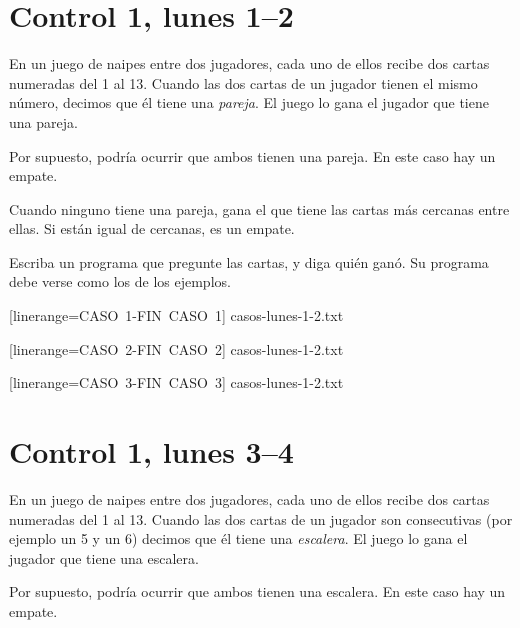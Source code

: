 \documentclass[12pt,spanish,a5paper,landscape]{article}
\begin{document}
  \pagestyle{empty}
  \thispagestyle{empty}

  \part*{Control 1, lunes 1--2}
  \newpage

  En un juego de naipes entre dos jugadores,
  cada uno de ellos recibe dos cartas numeradas del 1 al 13.
  Cuando las dos cartas de un jugador tienen el mismo número,
  decimos que él tiene una \emph{pareja}.
  El juego lo gana el jugador que tiene una pareja.

  Por supuesto,
  podría ocurrir que ambos tienen una pareja.
  En este caso hay un empate.

  Cuando ninguno tiene una pareja,
  gana el que tiene las cartas más cercanas entre ellas.
  Si están igual de cercanas, es un empate.

  Escriba un programa que pregunte las cartas,
  y diga quién ganó.
  Su programa debe verse como los de los ejemplos.

  \begin{minipage}{0.25\textwidth}
      [linerange=CASO\ 1-FIN\ CASO\ 1]%
      {casos-lunes-1-2.txt}
  \end{minipage}
  \hspace{1em}
  \begin{minipage}{0.25\textwidth}
      [linerange=CASO\ 2-FIN\ CASO\ 2]%
      {casos-lunes-1-2.txt}
  \end{minipage}
  \hspace{1em}
  \begin{minipage}{0.25\textwidth}
      [linerange=CASO\ 3-FIN\ CASO\ 3]%
      {casos-lunes-1-2.txt}
  \end{minipage}

  \newpage
  \part*{Control 1, lunes 3--4}
  \newpage

  En un juego de naipes entre dos jugadores,
  cada uno de ellos recibe dos cartas numeradas del 1 al 13.
  Cuando las dos cartas de un jugador son consecutivas
  (por ejemplo un 5 y un 6)
  decimos que él tiene una \emph{escalera}.
  El juego lo gana el jugador que tiene una escalera.

  Por supuesto,
  podría ocurrir que ambos tienen una escalera.
  En este caso hay un empate.
\end{document}
